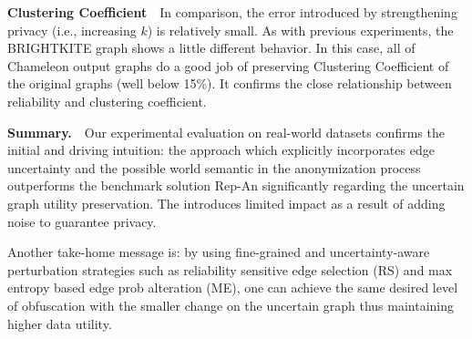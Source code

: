 \textbf{Clustering Coefficient}~~In comparison, the error introduced by strengthening privacy (i.e., increasing $k$) is relatively small. As with previous experiments, the BRIGHTKITE graph shows a little different behavior. In this case, all of Chameleon output graphs do a good job of preserving Clustering Coefficient of the original graphs (well below 15\%). It confirms the close relationship between reliability and clustering coefficient.


\textbf{Summary.}~~Our experimental evaluation on real-world datasets confirms the initial and driving intuition: the {\SysNameNS} approach which explicitly incorporates edge uncertainty and the possible world semantic in the anonymization process outperforms the benchmark solution Rep-An significantly regarding the uncertain graph utility preservation. The {\SysNameNS} introduces limited impact as a result of adding noise to guarantee privacy.  

Another take-home message is: by using fine-grained and uncertainty-aware perturbation strategies such as reliability sensitive edge selection (RS) and max entropy based edge prob alteration (ME), one can achieve the same desired level of obfuscation with the smaller change on the uncertain graph thus maintaining higher data utility. 




